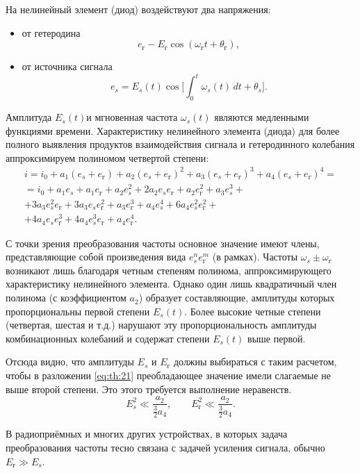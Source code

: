 \documentclass[14pt]{extarticle}
\begin{document}
	На нелинейный элемент (диод) воздействуют два напряжения:
	\begin{itemize}
		\item от гетеродина
		\[
		e_\text{г} - E_\text{г} \cos (\omega_\text{г}t + \theta_\text{г}),
		\]
		\item от источника сигнала
		\[
		e_s = E_s(t) \cos \Big[\int_{0}^{t} \omega_s(t)\, dt + \theta_s\Big].
		\]
	\end{itemize}
	
	Амплитуда $E_s(t)$и мгновенная частота $\omega_s(t)$ являются медленными функциями времени. Характеристику нелинейного элемента (диода) для более полного выявления продуктов взаимодействия сигнала и гетеродинного колебания аппроксимируем полиномом четвертой степени:
	\begin{multline} \label{eq:th:21}
		i = i_0 + a_1 (e_s + e_\text{г}) + a_2 (e_s + e_\text{г})^2 + a_3(e_s + e_\text{г})^3 + a_4(e_s + e_\text{г})^4 
		=\\=
		i_0 + a_1e_s + a_1e_\text{г} + a_2 e_s^2 + \boxed{2 a_2 e_s e_\text{г}} + a_2 e_\text{г}^2 + a_3 e_s^3 
		+\\+
		\boxed{3a_3 e_s^2 e_\text{г}} + \boxed{3 a_3 e_s e_\text{г}^2} + a_3 e_\text{г}^3 + a_4 e_s^4 + \boxed{6a_4 e_s^2 e_\text{г}^2}
		+\\+
		\boxed{4 a_4 e_s e_\text{г}^3} + \boxed{4 a_4 e_s^3 e_\text{г}} + a_4 e_\text{г}^4.
	\end{multline}
	
	С точки зрения преобразования частоты основное значение	имеют члены, представляющие собой произведения вида $e_s^n e_\text{г}^m$ (в рамках). Частоты $\omega_s \pm \omega_\text{г}$ возникают лишь благодаря четным степеням полинома, аппроксимирующего характеристику нелинейного элемента. Однако один лишь квадратичный член полинома (с коэффициентом $a_2$) образует составляющие, амплитуды которых пропорциональны первой степени $E_s(t)$. Более высокие четные степени (четвертая, шестая и т.д.) нарушают эту пропорциональность амплитуды комбинационных колебаний и содержат степени $E_s(t)$ выше первой.
	
	Отсюда видно, что амплитуды $E_s$ и $E_\text{г}$ должны выбираться с таким расчетом, чтобы в разложении \cref{eq:th:21} преобладающее значение имели слагаемые не выше второй степени. Это этого требуется выполнение неравенств.
	\[
	E_s^2 \ll \frac{a_2}{\frac32 a_4}, \qquad E_\text{г}^2 \ll \frac{a_2}{\frac32 a_4}.
	\]
	
	В радиоприёмных и многих других устройствах, в которых задача преобразования частоты тесно связана с задачей усиления сигнала, обычно \(E_\text{г} \gg E_s\).
	
\end{document}
